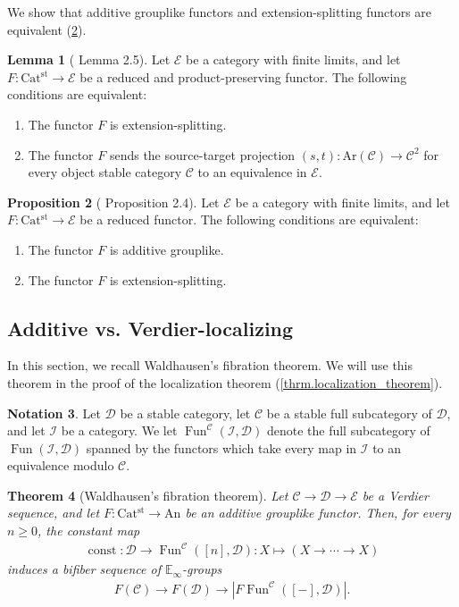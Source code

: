 \documentclass[a4paper,dvipdfmx,11pt,reqno]{amsart}
\DeclareMathOperator{\const}{const}
\DeclareMathOperator{\Fun}{Fun}
\newcommand{\C}{\mathcal{C}}
\newcommand{\D}{\mathcal{D}}
\newcommand{\E}{\mathcal{E}}
\newcommand{\I}{\mathcal{I}}
\newcommand{\An}{\mathrm{An}}
\newcommand{\Catst}{\mathrm{Cat^{st}}}
\newcommand{\Ar}{\mathrm{Ar}}
\newcommand{\Einf}{\mathbb{E}_{\infty}}
\newtheorem{theorem}{Theorem}[section]
\theoremstyle{definition}
\newtheorem{lemma}[theorem]{Lemma}
\newtheorem{notation}[theorem]{Notation}
\newtheorem{proposition}[theorem]{Proposition}
\begin{document}
We show that additive grouplike functors and extension-splitting functors are equivalent (\cref{HLS23.prop.2.4}). 

\begin{lemma}[\cite{HLS23} Lemma 2.5] \label{HLS23.lem.2.5}
  Let $\E$ be a category with finite limits, and let $F : \Catst \to \E$ be a reduced and product-preserving functor.
  The following conditions are equivalent:
  \begin{enumerate}
    \item The functor $F$ is extension-splitting.
    \item The functor $F$ sends the source-target projection $(s,t) : \Ar(\C) \to \C^2$ for every object stable category $\C$ to an equivalence in $\E$.
  \end{enumerate}
\end{lemma}

\begin{proposition}[\cite{HLS23} Proposition 2.4] \label{HLS23.prop.2.4}
  Let $\E$ be a category with finite limits, and let $F : \Catst \to \E$ be a reduced functor.
  The following conditions are equivalent:
  \begin{enumerate}
    \item The functor $F$ is additive grouplike.
    \item The functor $F$ is extension-splitting.
  \end{enumerate}
\end{proposition}

\subsection{Additive vs. Verdier-localizing}

In this section, we recall Waldhausen's fibration theorem.
We will use this theorem in the proof of the localization theorem (\cref{thrm.localization_theorem}).

\begin{notation}
  Let $\D$ be a stable category, let $\C$ be a stable full subcategory of $\D$, and let $\I$ be a category.
  We let $\Fun^{\C}(\I,\D)$ denote the full subcategory of $\Fun(\I,\D)$ spanned by the functors which take every map in $\I$ to an equivalence modulo $\C$.
\end{notation}

\begin{theorem}[Waldhausen's fibration theorem] \label{thrm.Waldhausen_fibration_theorem}
  Let $\C \to \D \to \E$ be a Verdier sequence, and let $F : \Catst \to \An$ be an additive grouplike functor.
  Then, for every $n \geq 0$, the constant map 
  \begin{align*}
    \const : \D \to \Fun^{\C}([n],\D) : X \mapsto (X \to \cdots \to X)
  \end{align*}
  induces a bifiber sequence of $\Einf$-groups 
  \begin{align*}
    F(\C) \to F(\D) \to |F\Fun^{\C}([-],\D)|.
  \end{align*}
\end{theorem}
\end{document}
